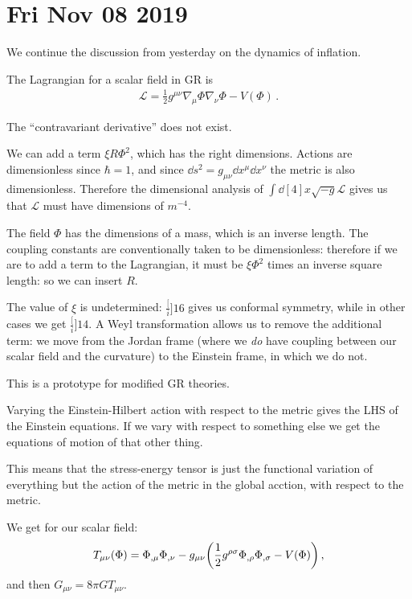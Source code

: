 \documentclass[main.tex]{subfiles}
\begin{document}
\section*{Fri Nov 08 2019}

We continue the discussion from yesterday on the dynamics of inflation.

The Lagrangian for a scalar field in GR is 
%
\begin{align}
  \mathscr{L} = \frac{1}{2} g^{\mu \nu } \nabla_{\mu } \Phi  \nabla_{\nu } \Phi - V(\Phi )
\,.
\end{align}

The ``contravariant derivative'' does not exist.


We can add a term \(\xi R \Phi^2\), which has the right dimensions. Actions are dimensionless since \(\hbar  =1\), and since \(\dd{s^2} = g_{\mu \nu } \dd{x^{\mu }} \dd{x^{\nu }}\) the metric is also dimensionless. Therefore the dimensional analysis of \(\int \dd[4]{x} \sqrt{-g} \mathscr{L}\) gives us that \(\mathscr{L}\) must have dimensions of \(m^{-4}\).

The field \(\Phi \) has the dimensions of a mass, which is an inverse length. The coupling constants are conventionally taken to be dimensionless: therefore if we are to add a term to the Lagrangian, it must be \( \xi \Phi^2 \) times an inverse square length: so we can insert \(R\).

The value of \(\xi \) is undetermined: \(\frac[i]{1}{6} \) gives us conformal symmetry, while in other cases we get \(\frac[i]{1}{4} \). 
A Weyl transformation allows us to remove the additional term: we move from the Jordan frame (where we \emph{do} have coupling between our scalar field and the curvature) to the Einstein frame, in which we do not.

This is a prototype for modified GR theories.

Varying the Einstein-Hilbert action with respect to the metric gives the LHS of the Einstein equations. If we vary with respect to something else we get the equations of motion of that other thing.

This means that the stress-energy tensor is just the functional variation of everything but the action of the metric in the global acction, with respect to the metric.

We get for our scalar field: 
%
\begin{align}
  T_{\mu \nu } (\Phi ) = \Phi_{,  \mu } \Phi_{, \nu } - g_{\mu \nu } \qty(\frac{1}{2} g^{\rho \sigma } \Phi_{, \rho } \Phi_{, \sigma } - V(\Phi ))
\,,
\end{align}
%
and then \(G_{\mu \nu } = 8 \pi G T_{\mu \nu }\).
\end{document}
